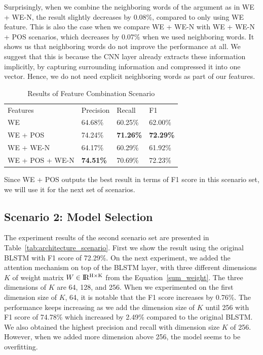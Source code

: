 Surprisingly, when we combine the neighboring words of the argument as in WE + WE-N, the result slightly decreases by 0.08\%, compared to only using WE feature. This is also the case when we compare WE + WE-N with WE + WE-N + POS scenarios, which decreases by 0.07\% when we used neighboring words. It shows us that neighboring words do not improve the performance at all. We suggest that this is because the CNN layer already extracts these information implicitly, by capturing surrounding information and compressed it into one vector. Hence, we do not need explicit neighboring words as part of our features. 

\begin{table}
	\caption{Results of Feature Combination Scenario}
	\label{tab:feature_scenario}
	\begin{tabular}{llll}
		Features		&Precision	&Recall		&F1			\\
		WE				&	64.68\%				&	60.25\%				&	62.00\%	\\
		WE + POS		&	74.24\%				&	\textbf{71.26\%}	&	\textbf{72.29\%}	\\
		WE + WE-N		&	64.17\%				&	60.29\%				&	61.92\%	\\
		WE + POS + WE-N	&	\textbf{74.51\%}	&	70.69\%				&	72.23\%	\\
	\end{tabular}
\end{table}

Since WE + POS outputs the best result in terms of F1 score in this scenario set, we will use it for the next set of scenarios.

\subsection{Scenario 2: Model Selection}
The experiment results of the second scenario set are presented in Table~\ref{tab:architecture_scenario}. First we show the result using the original BLSTM with F1 score of 72.29\%. On the next experiment, we added the attention mechanism on top of the BLSTM layer, with three different dimensions $K$ of weight matrix $W \in {\rm I\!R^{H \times K}}$ from the Equation~\ref{sum_weight}. The three dimensions of $K$ are 64, 128, and 256. When we experimented on the first dimension size of $K$, 64, it is notable that the F1 score increases by 0.76\%. The performance keeps increasing as we add the dimension size of $K$ until 256 with F1 score of 74.78\% which increased by 2.49\% compared to the original BLSTM. We also obtained the highest precision and recall with dimension size $K$ of 256. However, when we added more dimension above 256, the model seems to be overfitting.

